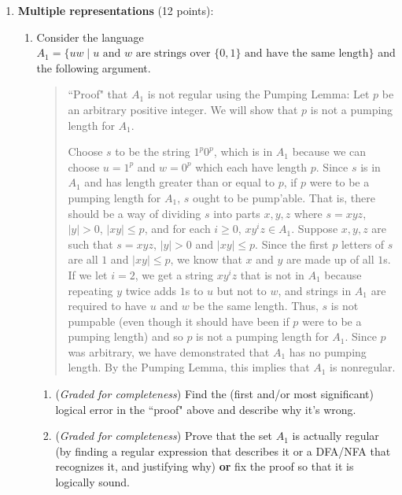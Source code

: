 \documentclass[12pt, oneside]{article}
\newcommand{\gradeComplete}{({\it Graded for completeness}) }
\begin{document}
\begin{enumerate}[wide, labelwidth=!, labelindent=0pt]
\item \textbf{Multiple representations} (12 points):

\begin{enumerate}
   \item Consider the language $A_1 = \{ uw \mid \text{$u$ and
   $w$ are strings over $\{0,1\}$ and have the same length} \}$
   and the following argument.

   \begin{quote}
      ``Proof" that $A_1$ is not regular using the Pumping Lemma: Let $p$ be 
      an arbitrary positive integer. We will show that $p$ is not a pumping length for $A_1$. 
      
      Choose $s$ to be the string $1^p 0^p$, which is in $A_1$ because
      we can choose $u = 1^p$ and $w = 0^p$ which each have length $p$.
      Since $s$ is in $A_1$ and has length greater than or equal to $p$, if $p$ were to be a
      pumping length for $A_1$, $s$ ought to be pump'able. 
      That is, there should be a way of dividing $s$ into parts $x,y,z$ where $s=xyz$,
      $|y| >0$, $|xy| \leq p$, and for each $i \geq 0$, $xy^iz \in A_1$.
      Suppose $x,y,z$ are such that $s = xyz$, $|y| > 0$ and $|xy| \leq p$.
      Since the first $p$ letters of $s$ are all $1$ and $|xy| \leq p$, we know
      that $x$ and $y$ are made up of all $1$s.  If we let $i=2$, we get 
      a string $xy^iz$ that is not in $A_1$ because repeating $y$ twice adds $1$s to 
      $u$ but not to $w$, and strings in $A_1$ are required to have $u$ and $w$ be the same
      length. Thus, $s$ is not pumpable (even though it should have been if $p$ were to be a pumping length)
      and so $p$ is not a pumping length for $A_1$.  Since $p$ was arbitrary, we have
      demonstrated that $A_1$ has no pumping length.  By the Pumping Lemma, this implies that 
      $A_1$ is nonregular.
      \end{quote}
      \begin{enumerate}
         \item \gradeComplete Find the (first and/or most significant) logical error in the ``proof" above 
         and describe why it's wrong.
   
         \item \gradeComplete Prove that the set $A_1$ is actually regular (by finding a regular expression that describes it or 
         a DFA/NFA that recognizes it, and justifying why) {\bf or} fix the proof so that it is logically sound.     
      \end{enumerate}


\end{enumerate}
\end{enumerate}
\end{document}
